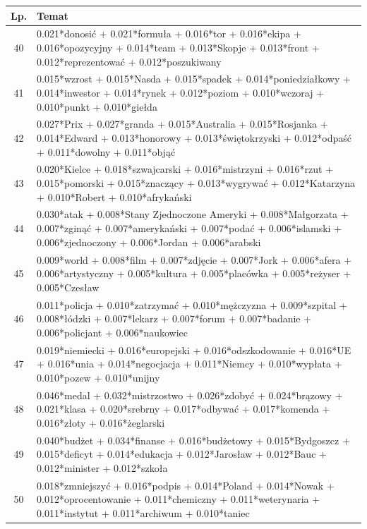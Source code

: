 \documentclass[11pt,a4paper]{article}
\begin{document}
\begin{table}[h]
\begin{tabular}{|c|>{\footnotesize}p{\linewidth}|}
\hline
Lp. & Temat \\\hline

40 & 0.021*donosić + 0.021*formuła + 0.016*tor + 0.016*ekipa + 0.016*opozycyjny + 0.014*team + 0.013*Skopje + 0.013*front + 0.012*reprezentować + 0.012*poszukiwany\\\hline
41 & 0.015*wzrost + 0.015*Nasda + 0.015*spadek + 0.014*poniedziałkowy + 0.014*inwestor + 0.014*rynek + 0.012*poziom + 0.010*wczoraj + 0.010*punkt + 0.010*giełda\\\hline
42 & 0.027*Prix + 0.027*granda + 0.015*Australia + 0.015*Rosjanka + 0.014*Edward + 0.013*honorowy + 0.013*świętokrzyski + 0.012*odpaść + 0.011*dowolny + 0.011*objąć\\\hline
43 & 0.020*Kielce + 0.018*szwajcarski + 0.016*mistrzyni + 0.016*rzut + 0.015*pomorski + 0.015*znaczący + 0.013*wygrywać + 0.012*Katarzyna + 0.010*Robert + 0.010*afrykański\\\hline
44 & 0.030*atak + 0.008*Stany Zjednoczone Ameryki + 0.008*Małgorzata + 0.007*zginąć + 0.007*amerykański + 0.007*podać + 0.006*islamski + 0.006*zjednoczony + 0.006*Jordan + 0.006*arabski\\\hline
45 & 0.009*world + 0.008*film + 0.007*zdjęcie + 0.007*Jork + 0.006*afera + 0.006*artystyczny + 0.005*kultura + 0.005*placówka + 0.005*reżyser + 0.005*Czesław\\\hline
46 & 0.011*policja + 0.010*zatrzymać + 0.010*mężczyzna + 0.009*szpital + 0.008*łódzki + 0.007*lekarz + 0.007*forum + 0.007*badanie + 0.006*policjant + 0.006*naukowiec\\\hline
47 & 0.019*niemiecki + 0.016*europejski + 0.016*odszkodowanie + 0.016*UE + 0.016*unia + 0.014*negocjacja + 0.011*Niemcy + 0.010*wypłata + 0.010*pozew + 0.010*unijny\\\hline
48 & 0.046*medal + 0.032*mistrzostwo + 0.026*zdobyć + 0.024*brązowy + 0.021*klasa + 0.020*srebrny + 0.017*odbywać + 0.017*komenda + 0.016*złoty + 0.016*żeglarski\\\hline
49 & 0.040*budżet + 0.034*finanse + 0.016*budżetowy + 0.015*Bydgoszcz + 0.015*deficyt + 0.014*edukacja + 0.012*Jarosław + 0.012*Bauc + 0.012*minister + 0.012*szkoła\\\hline
50 & 0.018*zmniejszyć + 0.016*podpis + 0.014*Poland + 0.014*Nowak + 0.012*oprocentowanie + 0.011*chemiczny + 0.011*weterynaria + 0.011*instytut + 0.011*archiwum + 0.010*taniec\\\hline

\end{tabular}
\end{table}
\end{document}
